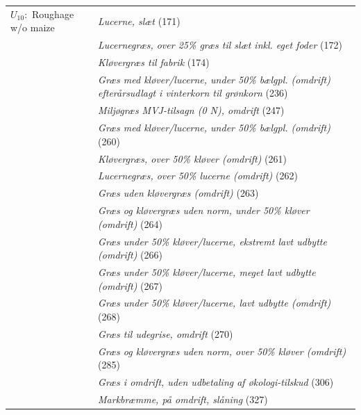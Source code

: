 \documentclass[12pt]{article}
\begin{document}
\begin{longtable}{l | p{9cm}}
$U_{10}:$ Roughage w/o maize
       & \textit{Lucerne, slæt} (171) \\
       & \textit{Lucernegræs, over 25\% græs til slæt inkl. eget foder} (172) \\
       & \textit{Kløvergræs til fabrik} (174) \\
       & \textit{Græs med kløver/lucerne, under 50\% bælgpl. (omdrift) efterårsudlagt i vinterkorn til grønkorn} (236) \\
       & \textit{Miljøgræs MVJ-tilsagn (0 N), omdrift} (247) \\
       & \textit{Græs med kløver/lucerne, under 50\% bælgpl. (omdrift)} (260) \\
       & \textit{Kløvergræs, over 50\% kløver (omdrift)} (261) \\
       & \textit{Lucernegræs, over 50\% lucerne (omdrift)} (262) \\
       & \textit{Græs uden kløvergræs (omdrift)} (263) \\
       & \textit{Græs og kløvergræs uden norm, under 50\% kløver (omdrift)} (264) \\
       & \textit{Græs under 50\% kløver/lucerne, ekstremt lavt udbytte (omdrift)} (266) \\
       & \textit{Græs under 50\% kløver/lucerne, meget lavt udbytte (omdrift)} (267) \\
       & \textit{Græs under 50\% kløver/lucerne, lavt udbytte (omdrift)} (268) \\
       & \textit{Græs til udegrise, omdrift} (270) \\
       & \textit{Græs og kløvergræs uden norm, over 50\% kløver (omdrift)} (285) \\
       & \textit{Græs i omdrift, uden udbetaling af økologi-tilskud} (306) \\
       & \textit{Markbræmme, på omdrift, slåning} (327) \\


\end{longtable}
\end{document}
